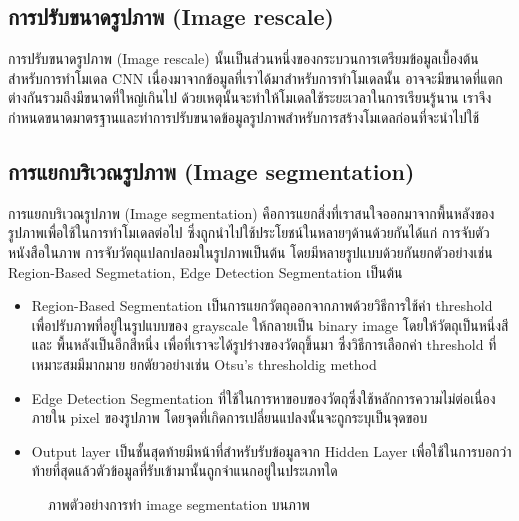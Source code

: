 \documentclass[12pt,oneside,openright,a4paper]{cpe-thai-project}
\begin{document}
\subsection{การปรับขนาดรูปภาพ (Image rescale)\cite{Imagepre}}
การปรับขนาดรูปภาพ (Image rescale) นั้นเป็นส่วนหนึ่งของกระบวนการเตรียมข้อมูลเบื้องต้นสำหรับการทำโมเดล CNN 
เนื่องมาจากข้อมูลที่เราได้มาสำหรับการทำโมเดลนั้น อาจจะมีขนาดที่แตกต่างกันรวมถึงมีขนาดที่ใหญ่เกินไป ด้วยเหตุนั้นจะทำให้โมเดลใช้ระยะเวลาในการเรียนรู้นาน 
เราจึงกำหนดขนาดมาตรฐานและทำการปรับขนาดข้อมูลรูปภาพสำหรับการสร้างโมเดลก่อนที่จะนำไปใช้

\subsection{การแยกบริเวณรูปภาพ (Image segmentation)\cite{Imagesegment}}
การแยกบริเวณรูปภาพ (Image segmentation) คือการแยกสิ่งที่เราสนใจออกมาจากพื้นหลังของรูปภาพเพื่อใช้ในการทำโมเดลต่อไป ซึ่งถูกนำไปใช้ประโยชน์ในหลายๆด้านด้วยกันได้แก่ 
การจับตัวหนังสือในภาพ การจับวัตถุแปลกปลอมในรูปภาพเป็นต้น โดยมีหลายรูปแบบด้วยกันยกตัวอย่างเช่น Region-Based Segmetation, Edge Detection Segmentation เป็นต้น
\begin{itemize}
  \item Region-Based Segmentation เป็นการแยกวัตถุออกจากภาพด้วยวิธีการใช้ค่า threshold เพื่อปรับภาพที่อยู่ในรูปแบบของ grayscale ให้กลายเป็น binary image โดยให้วัตถุเป็นหนึ่งสี และ พื้นหลังเป็นอีกสีหนึ่ง เพื่อที่เราจะได้รูปร่างของวัตถุขึ้นมา ซึ่งวิธีการเลือกค่า threshold ที่เหมาะสมมีมากมาย ยกตัยวอย่างเช่น Otsu’s thresholdig method

  \item Edge Detection Segmentation ที่ใช้ในการหาขอบของวัตถุซึ่งใช้หลักการความไม่ต่อเนื่องภายใน pixel ของรูปภาพ โดยจุดที่เกิดการเปลี่ยนแปลงนั้นจะถูกระบุเป็นจุดขอบ 
  \item Output layer เป็นชั้นสุดท้ายมีหน้าที่สำหรับรับข้อมูลจาก Hidden Layer เพื่อใช้ในการบอกว่าท้ายที่สุดแล้วตัวข้อมูลที่รับเข้ามานั้นถูกจำแนกอยู่ในประเภทใด
\end{itemize}
\begin{figure}[!ht]\centering
  \setlength{\fboxrule}{0.2mm} %
  \setlength{\fboxsep}{1cm}
  \caption{ภาพตัวอย่างการทำ image segmentation บนภาพ}\label{fig:imagesegment}
\end{figure}
\end{document}
